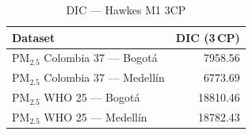 \begin{table}[htbp]
\centering
\caption{DIC --- Hawkes M1 3CP}
\label{tab:hawkes_dic_3cp}
\begin{tabular}{lr}
\toprule
Dataset & DIC (3\,CP) \\
\midrule
PM$_{2.5}$ Colombia 37 --- Bogot\'{a} & 7958.56 \\
PM$_{2.5}$ Colombia 37 --- Medell\'{i}n & 6773.69 \\
PM$_{2.5}$ WHO 25 --- Bogot\'{a} & 18810.46 \\
PM$_{2.5}$ WHO 25 --- Medell\'{i}n & 18782.43 \\
\bottomrule
\end{tabular}
\end{table}
